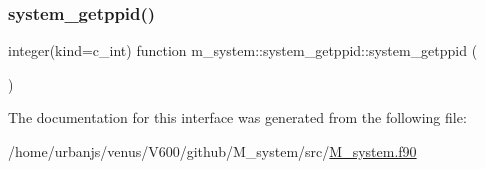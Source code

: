 \subsubsection{\texorpdfstring{system\+\_\+getppid()}{system\_getppid()}}
{\footnotesize\ttfamily integer(kind=c\+\_\+int) function m\+\_\+system\+::system\+\_\+getppid\+::system\+\_\+getppid (\begin{DoxyParamCaption}{ }\end{DoxyParamCaption})\hspace{0.3cm}{\ttfamily [private]}}



The documentation for this interface was generated from the following file\+:\begin{DoxyCompactItemize}
\item 
/home/urbanjs/venus/\+V600/github/\+M\+\_\+system/src/\mbox{\hyperlink{M__system_8f90}{M\+\_\+system.\+f90}}\end{DoxyCompactItemize}

